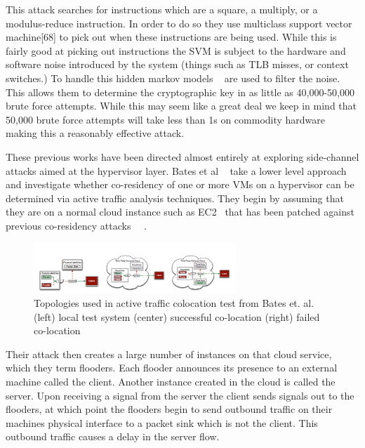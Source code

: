 This attack searches for instructions which are a square, a multiply, or a modulus-reduce instruction. In order to do so they use multiclass support vector machine[68] to pick out when these instructions are being used. While this is fairly good at picking out instructions the SVM is subject to the hardware and software noise introduced by the system (things such as TLB misses, or context switches.) To handle this hidden markov models ~\cite{bishop_pattern_2006} are used to filter the noise. This allows them to determine the cryptographic key in as little as 40,000-50,000 brute force attempts. While this may seem like a great deal we keep in mind that 50,000 brute force attempts will take less than 1s on commodity hardware making this a reasonably effective attack. 

These previous works have been directed almost entirely at exploring side-channel attacks aimed at the hypervisor layer. Bates et al ~\cite{bates_detecting_2012} take a lower level approach and investigate whether co-residency of one or more VMs on a hypervisor can be determined via active traffic analysis techniques. They begin by assuming that they are on a normal cloud instance such as EC2~\cite{_aws_EC2_2014} that has been patched against previous co-residency attacks ~\cite{zhang_homealone:_2011}~\cite{ristenpart_hey_2009}. 

\begin{figure}\label{BatesNetworkThing}
	  \centering
	  \includegraphics[width=3in]{figures/batesNetwork.png}
	  \caption{Topologies used in active traffic colocation test from Bates et. al. ~\cite{bates_detecting_2012}\tabularnewline
	  (left) local test system 	(center) successful co-location   (right) failed co-location }
\end{figure}



Their attack then creates a large number of instances on that cloud service, which they term flooders. Each flooder announces its presence to an external machine called the client. Another instance created in the cloud is called the server. Upon receiving a signal from the server the client sends signals out to the flooders, at which point the flooders begin to send outbound traffic on their machines physical interface to a packet sink which is not the client. This outbound traffic causes a delay in the server flow. 

